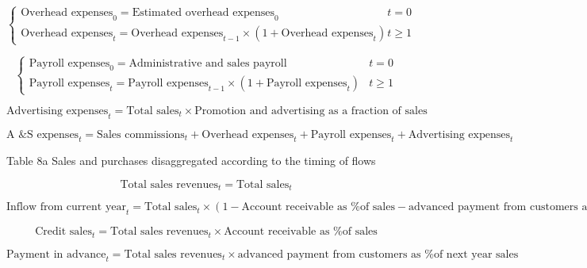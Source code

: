 \documentclass[12pt]{article}
\numberwithin{equation}{section}
\begin{document}
\begin{equation}
	\begin{cases}
		\text{Overhead expenses}_{0} = \text{Estimated overhead expenses}_{0} & t=0\\
		\text{Overhead expenses}_{t} = \text{Overhead expenses}_{t-1} \times (1+\text{Overhead expenses}_{t}) & t\geq1
	\end{cases}
\end{equation}

\begin{equation}
	\begin{cases}
		\text{Payroll expenses}_{0} = \text{Administrative and sales payroll} & t=0\\
		\text{Payroll expenses}_{t} = \text{Payroll expenses}_{t-1} \times (1+\text{Payroll expenses}_{t}) & t\geq1
	\end{cases}
\end{equation}

\begin{equation}
	\text{Advertising expenses}_{t} = \text{Total sales}_{t} \times \text{Promotion and advertising as a fraction of sales}
\end{equation}

\begin{equation}
	\text{A \& S expenses}_{t} = \text{Sales commissions}_{t} + \text{Overhead expenses}_{t} + \text{Payroll expenses}_{t} + \text{Advertising expenses}_{t}
\end{equation}


Table 8a  Sales and purchases disaggregated according to the timing of flows

\begin{equation}
	\text{Total sales revenues}_{t} = \text{Total sales}_{t}
\end{equation}

\begin{equation}
	\text{Inflow from current year}_{t} = \text{Total sales}_{t} \times \left(1 - \text{Account receivable as \% of sales} - \text{advanced payment from customers as \% of next year sales}\right)
\end{equation}

\begin{equation}
	\text{Credit sales}_{t} = \text{Total sales revenues}_{t} \times \text{Account receivable as \% of sales}
\end{equation}

\begin{equation}
	\text{Payment in advance}_{t} = \text{Total sales revenues}_{t} \times \text{advanced payment from customers as \% of next year sales}
\end{equation}
\end{document}
